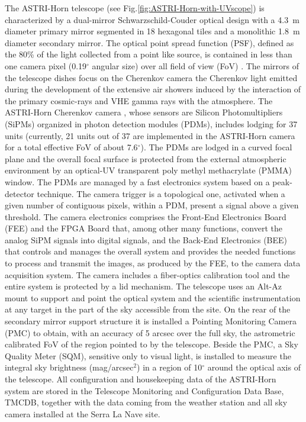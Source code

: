 The ASTRI-Horn telescope (see Fig.\ref{fig:ASTRI-Horn-with-UVscope}) is characterized by a dual-mirror Schwarzschild-Couder optical design with a 4.3~m diameter primary mirror segmented in 18 hexagonal tiles and a monolithic 1.8~m diameter secondary mirror. The optical point spread function (PSF), defined as the 80\% of the light collected from a point like source, is contained in less than one camera pixel (0.19$^{\circ}$ angular size) over all field of view (FoV)  \citep{Giro2017}. The mirrors of the telescope dishes focus on the Cherenkov camera the Cherenkov light emitted during the development of the extensive air showers induced by the interaction of the primary cosmic-rays and VHE gamma rays with the atmosphere. The ASTRI-Horn Cherenkov camera \citep{Catalano2018}, whose sensors are Silicon Photomultipliers (SiPMs) organized in photon detection modules (PDMs), includes lodging for 37 units (currently, 21 units out of 37 are implemented in the ASTRI-Horn camera for a total effective FoV of about 7.6$^{\circ}$). The PDMs are lodged in a curved focal plane and the overall focal surface is protected from the external atmospheric environment by an optical-UV transparent poly methyl methacrylate (PMMA)  window. The PDMs  
are managed by a fast electronics system based on a peak-detector technique. The camera trigger is a topological one, activated when a given number of contiguous pixels, within a PDM, present a signal above a given threshold. The camera electronics comprises the Front-End Electronics Board (FEE) and the FPGA Board that, among other many functions, convert the analog SiPM signals into digital signals, and the Back-End Electronics (BEE) that controls and manages the overall system and provides the needed functions to process and transmit the images, as produced by the FEE, to the camera data acquisition system. The camera includes a fiber-optics calibration tool and the entire system is protected by a lid mechanism. The telescope uses an Alt-Az mount to support and point the optical system and the scientific instrumentation at any target in the part of the sky accessible from the site. On the rear of the secondary mirror support structure it is installed a Pointing Monitoring Camera (PMC) to obtain, with an accuracy of 5 arcsec over the full sky, the astrometric calibrated FoV of the region pointed to by the telescope. Beside the PMC, a Sky Quality Meter (SQM), sensitive only to visual light, is installed to measure the integral sky brightness (mag/arcsec$^{2}$) in a region of 10$^{\circ}$ around the optical axis of the telescope. All configuration and housekeeping data of the ASTRI-Horn system are stored in the Telescope Monitoring and Configuration Data Base, TMCDB, together with the data coming from the weather station and all sky camera installed at the Serra La Nave site.

